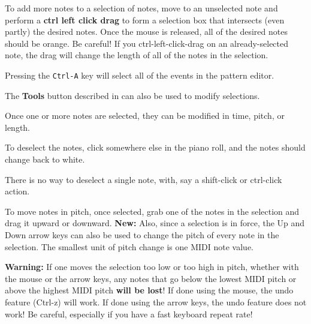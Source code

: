    To add more notes to a selection of notes, move to an unselected note
   and perform a \textbf{ctrl left click drag}
   to form a selection box that intersects (even partly) the desired notes.
   Once the mouse is released, all of the desired notes should be orange.
   Be careful!  If you ctrl-left-click-drag on an already-selected note,
   the drag will change the length of all of the notes in the selection.

   Pressing the \texttt{Ctrl-A} key will select all of the events in the
   pattern editor.

   The \textbf{Tools} button described in
    can also be used to
   modify selections.

   Once one or more notes are selected, they can be modified in time,
   pitch, or length.

   To deselect the notes, click somewhere else in the piano roll, and the notes
   should change back to white.

   There is no way to deselect a single note, with, say a shift-click
   or ctrl-click action.


   To move notes in pitch, once selected, grab one of the notes in the
   selection and drag it upward or downward.
   \textbf{New:}
   Also, since a selection is in force, the Up and Down arrow keys can also
   be used to change the pitch of every note in the selection.
   The smallest unit of pitch change is one MIDI note value.

   \textbf{Warning:}
   If one moves the selection too low or too high in pitch, whether with the
   mouse or the arrow keys, any notes that go below the lowest MIDI pitch or
   above the highest MIDI pitch \textbf{will be lost}!
   If done using the mouse, the undo feature (Ctrl-z) will work.
   If done using the arrow keys, the undo feature does not work!
   Be careful, especially if you have a fast keyboard repeat rate!


